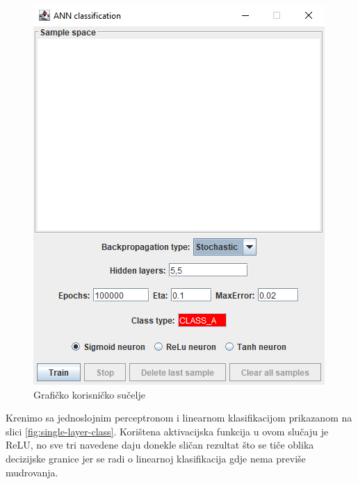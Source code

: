 \documentclass[times, utf8, zavrsni]{fer}
\begin{document}
\begin{figure}[H]
    \centering
    \includegraphics[scale=0.6]{img/gui.png}
    \caption[Caption for LOF]{Grafičko korisničko sučelje}
    \label{fig:gui}
\end{figure}

Krenimo sa jednoslojnim perceptronom i linearnom klasifikacijom prikazanom na slici \ref{fig:single-layer-class}. Korištena aktivacijska funkcija u ovom slučaju je ReLU, no sve tri navedene daju donekle sličan rezultat što se tiče oblika decizijske granice jer se radi o linearnoj klasifikacija gdje nema previše mudrovanja.
\end{document}
